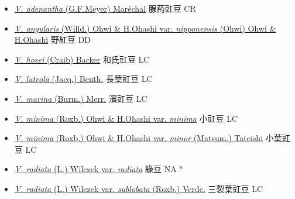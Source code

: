 \begin{itemize}
  \begin{itemize}
        \item[] \href{http://www.theplantlist.org/tpl1.1/search?q=Vigna+adenantha}{\textit{V. adenantha} (G.F.Meyer) Maréchal}   腺葯豇豆 CR
        \item[] \href{http://www.theplantlist.org/tpl1.1/search?q=Vigna+angularis+var.+nipponensis}{\textit{V. angularis} (Willd.) Ohwi \& H.Ohashi var. \textit{nipponensis} (Ohwi) Ohwi \& H.Ohashi}   野紅豆 DD
        \item[] \href{http://www.theplantlist.org/tpl1.1/search?q=Vigna+hosei}{\textit{V. hosei} (Craib) Backer}   和氏豇豆 LC
        \item[] \href{http://www.theplantlist.org/tpl1.1/search?q=Vigna+luteola}{\textit{V. luteola} (Jacq.) Benth.}   長葉豇豆 LC
        \item[] \href{http://www.theplantlist.org/tpl1.1/search?q=Vigna+marina}{\textit{V. marina} (Burm.) Merr.}   濱豇豆 LC
        \item[] \href{http://www.theplantlist.org/tpl1.1/search?q=Vigna+minima+var.+minima}{\textit{V. minima} (Roxb.) Ohwi \& H.Ohashi var. \textit{minima}}   小豇豆 LC
        \item[] \href{http://www.theplantlist.org/tpl1.1/search?q=Vigna+minima+var.+minor}{\textit{V. minima} (Roxb.) Ohwi \& H.Ohashi var. \textit{minor} (Matsum.) Tateishi}   小葉豇豆 LC
        \item[] \href{http://www.theplantlist.org/tpl1.1/search?q=Vigna+radiata+var.+radiata}{\textit{V. radiata} (L.) Wilczek var. \textit{radiata}}   綠豆 NA $^n$
        \item[] \href{http://www.theplantlist.org/tpl1.1/search?q=Vigna+radiata+var.+sublobata}{\textit{V. radiata} (L.) Wilczek var. \textit{sublobata} (Roxb.) Verdc.}   三裂葉豇豆 LC

\end{itemize}
\end{itemize}
